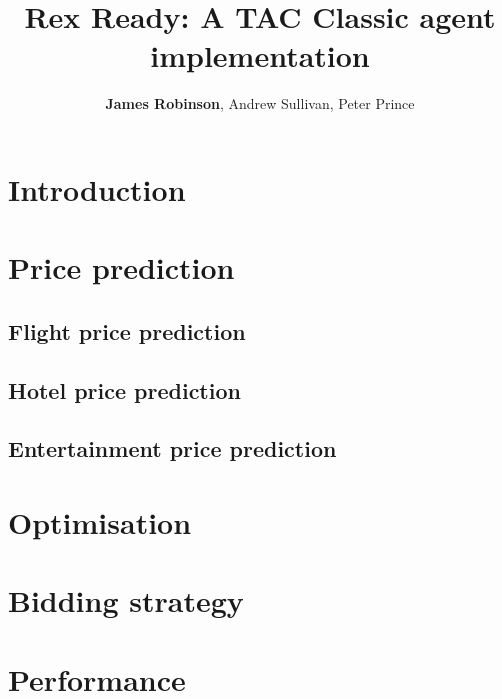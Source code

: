 \documentclass[a4paper]{article}
\title{Rex Ready: A TAC Classic agent implementation}
\author{\textbf{James Robinson}, Andrew Sullivan, Peter Prince}
\begin{document}
\maketitle

\section{Introduction}

\section{Price prediction}

\subsection{Flight price prediction}

\subsection{Hotel price prediction}

\subsection{Entertainment price prediction}

\section{Optimisation}

\section{Bidding strategy}

\section{Performance}
\end{document}
